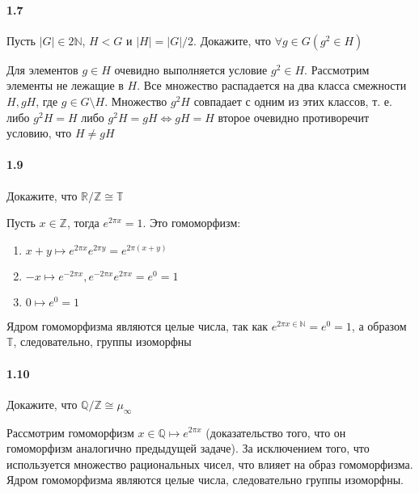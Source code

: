 \documentclass[a4paper,12pt]{article}
\begin{document}
\paragraph{1.7} Пусть $|G| \in 2\mathbb{N}$, $H < G$ и $|H| = |G|/2$. Докажите, что $\forall g \in G \left(g^2 \in H\right)$

\begin{Solution}
Для элементов $g \in H$ очевидно выполняется условие $g^2 \in H$. Рассмотрим элементы не лежащие в $H$. Все множество распадается на два класса смежности $H, gH$, где $g \in G \setminus H$. Множество $g^2H$ совпадает с одним из этих классов, т. е. либо $g^2H = H$ либо $g^2H = gH \Leftrightarrow gH = H$ второе очевидно противоречит условию, что $H \not= gH$
\end{Solution}

\paragraph{1.9} Докажите, что $\mathbb{R}/\mathbb{Z} \cong \mathbb{T}$

\begin{Solution}
Пусть $x \in \mathbb{Z}$, тогда $e^{2 \pi x} = 1$. Это гомоморфизм:
\begin{enumerate}
\item $x+y \mapsto e^{2 \pi x}e^{2 \pi y} = e^{2 \pi \left(x+y\right)}$

\item $-x \mapsto e^{-2 \pi x}, e^{-2 \pi x} e^{2 \pi x} = e^0 = 1$

\item $0 \mapsto e^0 = 1$
\end{enumerate}
Ядром гомоморфизма являются целые числа, так как $e^{2 \pi x \in \mathbb{N}} = e^0 = 1$, а образом $\mathbb{T}$, следовательно, группы изоморфны
\end{Solution}

\paragraph{1.10} Докажите, что $\mathbb{Q}/\mathbb{Z} \cong \mu_{\infty}$

\begin{Solution}
Рассмотрим гомоморфизм $x \in \mathbb{Q} \mapsto e^{2 \pi x}$ (доказательство того, что он гомоморфизм аналогично предыдущей задаче). За исключением того, что используется множество рациональных чисел, что влияет на образ гомоморфизма.
Ядром гомоморфизма являются целые числа, следовательно группы изоморфны.
\end{Solution}
\end{document}
